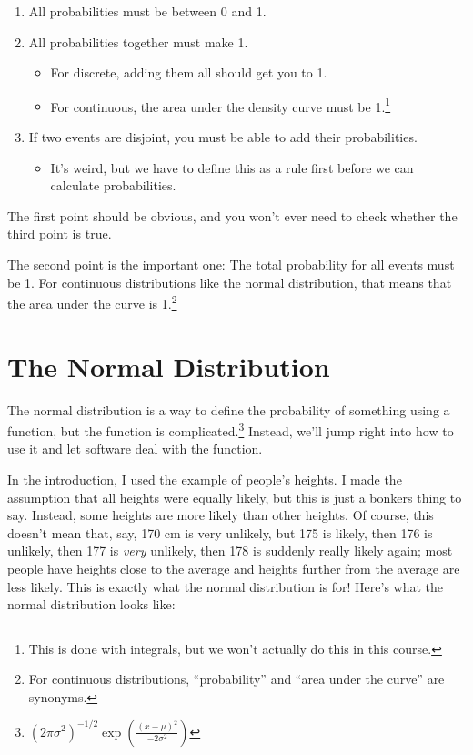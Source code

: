 \documentclass[
  letterpaper,
  DIV=11,
  numbers=noendperiod]{scrreprt}
\providecommand{\tightlist}{%
  \setlength{\itemsep}{0pt}\setlength{\parskip}{0pt}}\usepackage{longtable,booktabs,array}
\begin{document}
\begin{enumerate}
\def\labelenumi{\arabic{enumi}.}
\tightlist
\item
  All probabilities must be between 0 and 1.
\item
  All probabilities together must make 1.

  \begin{itemize}
  \tightlist
  \item
    For discrete, adding them all should get you to 1.
  \item
    For continuous, the area under the density curve must be
    1.\footnote{This is done with integrals, but we won't actually do
      this in this course.}
  \end{itemize}
\item
  If two events are disjoint, you must be able to add their
  probabilities.

  \begin{itemize}
  \tightlist
  \item
    It's weird, but we have to define this as a rule first before we can
    calculate probabilities.
  \end{itemize}
\end{enumerate}

The first point should be obvious, and you won't ever need to check
whether the third point is true.

The second point is the important one: The total probability for all
events must be 1. For continuous distributions like the normal
distribution, that means that the area under the curve is 1.\footnote{For
  continuous distributions, ``probability'' and ``area under the curve''
  are synonyms.}

\hypertarget{the-normal-distribution}{%
\chapter{The Normal Distribution}\label{the-normal-distribution}}

The normal distribution is a way to define the probability of something
using a function, but the function is complicated.\footnote{\((2\pi\sigma^2)^{-1/2}\exp\left(\frac{(x-\mu)^2}{-2\sigma^2}\right)\)}
Instead, we'll jump right into how to use it and let software deal with
the function.

In the introduction, I used the example of people's heights. I made the
assumption that all heights were equally likely, but this is just a
bonkers thing to say. Instead, some heights are more likely than other
heights. Of course, this doesn't mean that, say, 170 cm is very
unlikely, but 175 is likely, then 176 is unlikely, then 177 is
\emph{very} unlikely, then 178 is suddenly really likely again; most
people have heights close to the average and heights further from the
average are less likely. This is exactly what the normal distribution is
for! Here's what the normal distribution looks like:
\end{document}
